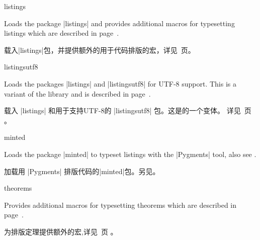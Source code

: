 \begin{docTcbKey}[library]{listings}{}{}

Loads the package |listings| %
and provides additional macros for typesetting listings which are described in %
page~\pageref{sec:listings}.

载入|listings|包，并提供额外的用于代码排版的宏，详见~\pageref{sec:listings}页。%

\end{docTcbKey}

\begin{docTcbKey}[library]{listingsutf8}{}{}

Loads the packages |listings| %
 and |listingsutf8| %
  for UTF-8 support.
This is a variant of the library 
and is described in %
page~\pageref{sec:listings}.

载入 |listings| 和用于支持UTF-8的 |listingsutf8| 包。这是的一个变体。%
详见~\pageref{sec:listings}页%
。

\end{docTcbKey}

\begin{docTcbKey}[library]{minted}{}{}

Loads the package |minted| %
to typeset listings with the |Pygments| %
 tool, also see .

加载用 |Pygments| %
排版代码的|minted|包。另见。

\end{docTcbKey}

\begin{docTcbKey}[library]{theorems}{}{}

Provides additional
macros for typesetting theorems which are described in %
page~\pageref{sec:theorems}.

为排版定理提供额外的宏,详见~\pageref{sec:theorems}页%
。

\end{docTcbKey}


